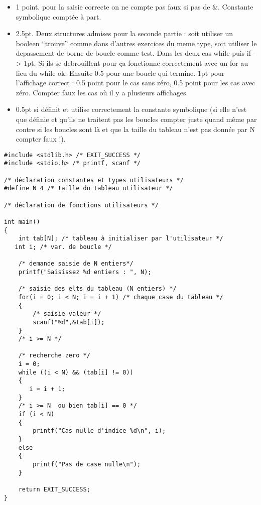 \begin{correction}
  \begin{itemize}
\item 1 point. pour la saisie correcte on ne compte pas faux si pas de
  \&.  Constante symbolique comptée à part.
\item 2.5pt. Deux structures admises pour la seconde partie : soit utiliser un
booleen ``trouve'' comme dans d'autres exercices du meme type, soit
utiliser le depassement de borne de boucle comme test. Dans les deux
cas while puis if -> 1pt. Si ils se debrouillent pour ça fonctionne
correctement avec un for au lieu du while ok. Ensuite 0.5 pour une
boucle qui termine. 1pt pour l'affichage correct : 0.5 point pour le
cas sans zéro, 0.5 point pour les cas avec zéro. Compter faux les cas
où il y a plusieurs affichages.
\item 0.5pt si définit et utilise correctement la constante symbolique
  (si elle n'est que définie et qu'ils ne traitent pas les boucles
  compter juste quand même par contre si les boucles sont là et que la
  taille du tableau n'est pas donnée par N compter faux !).
\end{itemize}
\begin{small}
\begin{verbatim}
#include <stdlib.h> /* EXIT_SUCCESS */
#include <stdio.h> /* printf, scanf */

/* déclaration constantes et types utilisateurs */
#define N 4 /* taille du tableau utilisateur */

/* déclaration de fonctions utilisateurs */

int main()
{
    int tab[N]; /* tableau à initialiser par l'utilisateur */
   int i; /* var. de boucle */

    /* demande saisie de N entiers*/
    printf("Saisissez %d entiers : ", N);

    /* saisie des elts du tableau (N entiers) */
    for(i = 0; i < N; i = i + 1) /* chaque case du tableau */
    {
        /* saisie valeur */
        scanf("%d",&tab[i]);
    }
    /* i >= N */

    /* recherche zero */
    i = 0;
    while ((i < N) && (tab[i] != 0)) 
    {
       i = i + 1;
    }
    /* i >= N  ou bien tab[i] == 0 */
    if (i < N)
    {
        printf("Cas nulle d'indice %d\n", i);
    }
    else
    {
        printf("Pas de case nulle\n");
    }

    return EXIT_SUCCESS;
}
\end{verbatim}
\end{small}
\end{correction}

